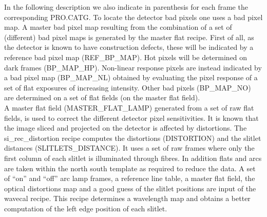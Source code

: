 In the following description we also indicate in parenthesis for each frame 
the corresponding PRO.CATG.
To locate the detector bad pixels one uses a bad pixel map. A master bad 
pixel map resulting from the combination of a set of (different) bad pixel 
maps is generated by the master flat recipe. 
First of all, as the detector is known to have construction defects, these 
will be indicated by a reference bad pixel map (REF\_BP\_MAP).
Hot pixels will be determined on dark frames (BP\_MAP\_HP). 
Non-linear response pixels are instead indicated by a bad pixel map 
(BP\_MAP\_NL) obtained by evaluating the pixel response of a set of flat 
exposures of increasing intensity. 
Other bad pixels (BP\_MAP\_NO) are determined on a set of flat fields (on 
the master flat field).\\
A master flat field (MASTER\_FLAT\_LAMP)
generated from a set of raw flat 
fields, is used to correct the   different detector pixel sensitivities.
It is known that the image sliced and projected on the detector is affected 
by distortions.
The si\_rec\_distortion recipe computes the distortions (DISTORTION) and 
the slitlet distances (SLITLETS\_DISTANCE). It uses a set of raw frames 
where only the first column of each slitlet is illuminated through fibres. 
In addition flats and arcs are taken within the north south template as 
required to reduce the data.
A set of ``on'' and ``off'' arc lamp frames, a reference line table, a master 
flat field, the optical distortions map and a good guess of the slitlet 
positions are input of the wavecal recipe.  This recipe determines a 
wavelength map and obtains a better computation of the left edge position 
of each slitlet.\\

